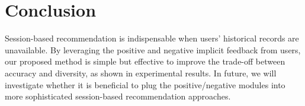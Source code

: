 \section{Conclusion}

Session-based recommendation is indispensable when users' historical records are unavailable. 
By leveraging the positive and negative implicit feedback from users, 
our proposed method is simple but effective to improve the trade-off between accuracy and diversity, 
as shown in experimental results. In future, we will investigate whether it is beneficial to
plug the positive/negative modules into more sophisticated session-based recommendation approaches.
